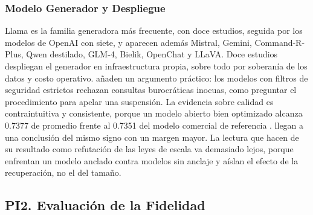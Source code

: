 \documentclass[man,12pt,floatsintext,donotrepeattitle]{apa7}
\begin{document}
\subsubsection{Modelo Generador y Despliegue}
Llama es la familia generadora más frecuente, con doce estudios, seguida por los modelos de OpenAI con siete, y aparecen además Mistral, Gemini, Command-R-Plus, Qwen destilado, GLM-4, Bielik, OpenChat y LLaVA. Doce estudios despliegan el generador en infraestructura propia, sobre todo por soberanía de los datos y costo operativo. \textcite{jayakody2026} añaden un argumento práctico: los modelos con filtros de seguridad estrictos rechazan consultas burocráticas inocuas, como preguntar el procedimiento para apelar una suspensión. La evidencia sobre calidad es contraintuitiva y consistente, porque un modelo abierto bien optimizado alcanza 0.7377 de promedio frente al 0.7351 del modelo comercial de referencia \parencite{khasanova2025}. \textcite{nguyenl2025} llegan a una conclusión del mismo signo con un margen mayor. La lectura que hacen \textcite{jayakody2026} de su resultado como refutación de las leyes de escala va demasiado lejos, porque enfrentan un modelo anclado contra modelos sin anclaje y aíslan el efecto de la recuperación, no el del tamaño.

\subsection{PI2. Evaluación de la Fidelidad}
\end{document}
